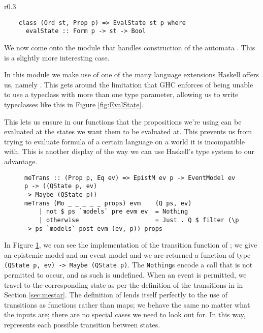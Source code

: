 \documentclass[10pt, a4paper]{report}
\begin{document}
\section{}
\label{sec:MEHaskell}

\begin{wrapfigure}{r}{0.3\textwidth}
  \begin{verbatim}
    class (Ord st, Prop p) => EvalState st p where
      evalState :: Form p -> st -> Bool
\end{verbatim}
  \caption{}
  \label{fig:EvalState}
\end{wrapfigure}

We now come onto the module that handles construction of the automata \mestar.
This is a slightly more interesting case.

In this module we make use of one of the many language extensions Haskell offers
us, namely . This gets around the limitation that
GHC enforces of being unable to use a typeclass with more than one type
parameter, allowing us to write typeclasses like this in Figure
\ref{fig:EvalState}.

This lets us ensure in our functions that the propositions we're using can be
evaluated at the states we want them to be evaluated at. This prevents us from
trying to evaluate formula of a certain language on a world it is incompatible
with. This is another display of the way we can use Haskell's type system to our
advantage. 

\begin{figure}[h]
\begin{verbatim}
meTrans :: (Prop p, Eq ev) => EpistM ev p -> EventModel ev p -> ((QState p, ev)
-> Maybe (QState p))
meTrans (Mo _ _ _ _ _ props) evm    (Q ps, ev)
    | not $ ps `models` pre evm ev  = Nothing
    | otherwise                     = Just . Q $ filter (\p -> ps `models` post evm (ev, p)) props
\end{verbatim}
  \caption{}
  \label{fig:metrans}
\end{figure}

In Figure \ref{fig:metrans}, we can see the implementation of the transition
function of \mestar; we give an epistemic model and an event model and we are
returned a function of type \texttt{(QState p, ev) -> Maybe (QState
  p)}. The \texttt{Nothing}s encode a call that is not permitted to
occur, and as such is undefined. When an event is permitted, we travel to the
corresponding state as per the definition of the transitions in \mestar in
Section \ref{sec:mestar}. The definition of \mestar lends itself perfectly to
the use of transitions as functions rather than maps; we behave the same no
matter what the inputs are; there are no special cases we need to look out for.
In this way, \mestar represents each possible transition between states. 
\end{document}
